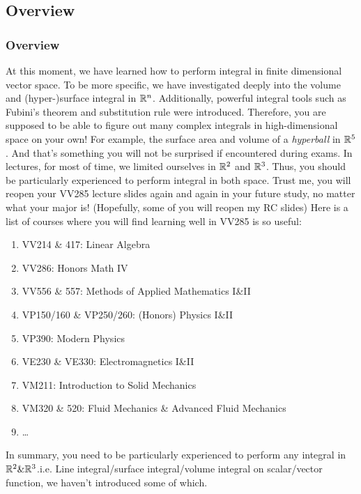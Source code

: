 \documentclass[12pt, t]{beamer}
\renewcommand{\emph}[1]{{\color{Turquoise3}\textsl{#1}}}
\begin{document}
\subsection{Overview}
\begin{frame}[allowframebreaks]
    \frametitle{Overview}
    At this moment, we have learned how to perform integral in finite dimensional vector space. To be more specific, we have investigated deeply into the volume and (hyper-)surface integral in $\mathbb{R}^n$. Additionally, powerful integral tools such as Fubini's theorem and substitution rule were introduced. Therefore, you are supposed to be able to figure out many complex integrals in high-dimensional space on your own! For example, the surface area and volume of a \emph{hyperball} in $\mathbb{R}^5$. And that's something you will not be surprised if encountered during exams. In lectures, for most of time, we limited ourselves in $\mathbb{R}^2$ and $\mathbb{R}^3$. Thus, you should be particularly experienced to perform integral in both space.
    \newpage
    Trust me, you will reopen your VV285 lecture slides again and again in your future study, no matter what your major is! (Hopefully, some of you will reopen my RC slides) Here is a list of courses where you will find learning well in VV285 is so useful:
    \begin{enumerate}
        \item VV214 \& 417: Linear Algebra
        \item VV286: Honors Math IV
        \item VV556 \& 557: Methods of Applied Mathematics I\&II
        \item VP150/160 \& VP250/260: (Honors) Physics I\&II
        \item VP390: Modern Physics
        \item VE230 \& VE330: Electromagnetics I\&II
        \item VM211: Introduction to Solid Mechanics
        \item VM320 \& 520: Fluid Mechanics \& Advanced Fluid Mechanics
        \item \dots
    \end{enumerate}
    \newpage
    In summary, you need to be particularly experienced to perform any integral in $\mathbb{R}^2 \& \mathbb{R}^3$.{i.e. Line integral/surface integral/volume integral on scalar/vector function, we haven't introduced some of which.}
\end{frame}
\end{document}
